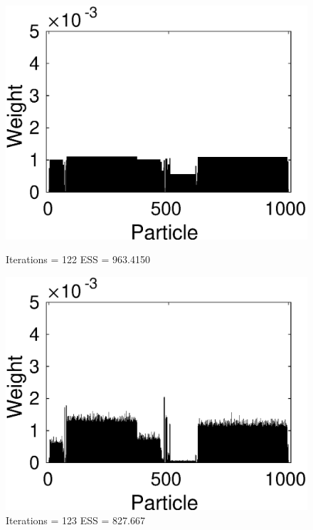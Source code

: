 \documentclass[12pt]{article}
\begin{document}
\begin{figure}[ht!]
\begin{minipage}{0.5\textwidth}
		\includegraphics[scale = 0.5]{./Figures/122.eps}
		\caption*{Iterations = 122 ESS = 963.4150}
	\end{minipage}%
	\begin{minipage}{0.5\textwidth}
		\centering
		\includegraphics[scale = 0.5]{./Figures/123.eps}
		\caption*{Iterations = 123 ESS = 827.667}
	\end{minipage}
	\begin{minipage}{0.5\textwidth}
		\centering

\end{minipage}
\end{figure}
\end{document}
